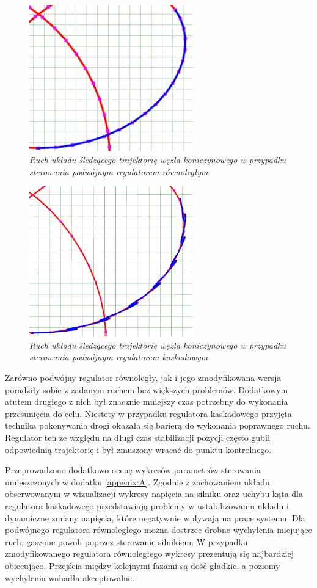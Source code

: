 \documentclass[12pt, oneside]{report}
\theoremstyle{definition}
\begin{document}
\begin{figure}[H]
	\centering
		\includegraphics[width = 200pt]{TrajectoryTrefoilKnotGood} 
		\caption{\textit{Ruch układu śledzącego trajektorię węzła koniczynowego w przypadku sterowania podwójnym regulatorem równoległym}}
		\label{TrajectoryTrefoilKnotGood}
\end{figure}

\begin{figure}[H]
	\centering
		\includegraphics[width = 200pt]{TrajectoryTrefoilKnotWrong} 
		\caption{\textit{Ruch układu śledzącego trajektorię węzła koniczynowego w przypadku sterowania podwójnym regulatorem kaskadowym}}
		\label{TrajectoryTrefoilKnotWrong}
\end{figure}

Zarówno podwójny regulator równoległy, jak i jego zmodyfikowana wersja poradziły sobie z zadanym ruchem bez większych problemów. Dodatkowym atutem drugiego z nich był znacznie mniejszy czas potrzebny do wykonania przesunięcia do celu. Niestety w przypadku regulatora kaskadowego przyjęta technika pokonywania drogi okazała się barierą do wykonania poprawnego ruchu. Regulator ten ze względu na długi czas stabilizacji pozycji często gubił odpowiednią trajektorię i był zmuszony wracać do punktu kontrolnego.

Przeprowadzono dodatkowo ocenę wykresów parametrów sterowania umieszczonych w dodatku \ref{appenix:A}. Zgodnie z zachowaniem układu obserwowanym w wizualizacji wykresy napięcia na silniku oraz uchybu kąta dla regulatora kaskadowego przedstawiają problemy w ustabilizowaniu układu i dynamiczne zmiany napięcia, które negatywnie wpływają na pracę systemu. Dla podwójnego regulatora równoległego można dostrzec drobne wychylenia inicjujące ruch, gaszone powoli poprzez sterowanie silnikiem. W przypadku zmodyfikowanego regulatora równoległego wykresy prezentują się najbardziej obiecująco. Przejścia między kolejnymi fazami są dość gładkie, a poziomy wychylenia wahadła akceptowalne.
\end{document}
